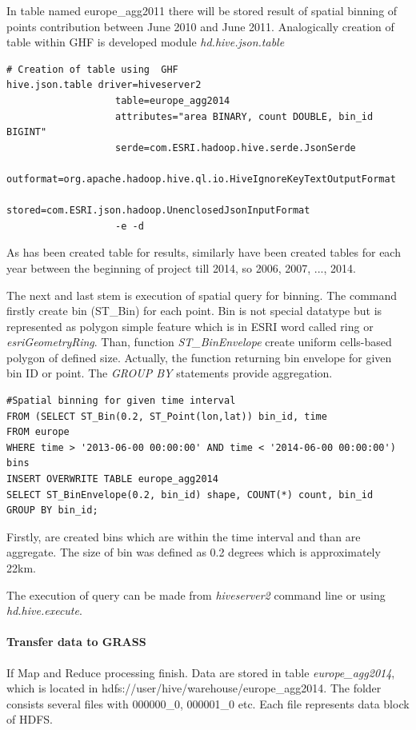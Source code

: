\documentclass[a4paper,12pt,oneside]{report}
\begin{document}
	In table named europe\_agg2011 there will be stored result of spatial binning of points contribution between June 2010 and June 2011.
	Analogically creation of table within GHF is developed module \textit{hd.hive.json.table}
\begin{footnotesize}
	\begin{lstlisting}[style=python]
# Creation of table using  GHF
hive.json.table driver=hiveserver2
                   table=europe_agg2014
                   attributes="area BINARY, count DOUBLE, bin_id BIGINT"
                   serde=com.ESRI.hadoop.hive.serde.JsonSerde
                   outformat=org.apache.hadoop.hive.ql.io.HiveIgnoreKeyTextOutputFormat
                   stored=com.ESRI.json.hadoop.UnenclosedJsonInputFormat
                   -e -d
	\end{lstlisting}
\end{footnotesize}
	As has been created table for results, similarly have been created tables for each year between 
	the beginning of project till 2014, so 2006, 2007, ..., 2014. 
	
	
	The next and last stem is execution of spatial query for binning. The command firstly create bin (ST\_Bin) for each point. Bin is not special datatype but is represented as polygon simple feature which is in ESRI word called ring or \textit{esriGeometryRing}. Than, function \textit{ST\_BinEnvelope} create uniform  cells-based polygon of defined size. Actually, the function returning bin envelope for given bin ID or point. The \textit{GROUP BY} statements provide aggregation.
\begin{footnotesize}
	\begin{lstlisting}[style=python]
#Spatial binning for given time interval
FROM (SELECT ST_Bin(0.2, ST_Point(lon,lat)) bin_id, time 
FROM europe 
WHERE time > '2013-06-00 00:00:00' AND time < '2014-06-00 00:00:00') bins
INSERT OVERWRITE TABLE europe_agg2014
SELECT ST_BinEnvelope(0.2, bin_id) shape, COUNT(*) count, bin_id 
GROUP BY bin_id;
	\end{lstlisting}
\end{footnotesize}
	Firstly, are created bins which are within the time interval and than are aggregate.
	The size of bin was defined as 0.2 degrees which is approximately 22km.
	
	The execution of query can be made from \textit{hiveserver2} command line or using \newline \textit{hd.hive.execute}. 
	
	\paragraph{Transfer data to GRASS}
	If Map and Reduce processing finish. Data are stored in table \textit{europe\_agg2014}, 
	which is located in hdfs://user/hive/warehouse/europe\_agg2014. The folder consists several
	files with 000000\_0, 000001\_0 etc. Each file represents data block of HDFS.  
\end{document}
